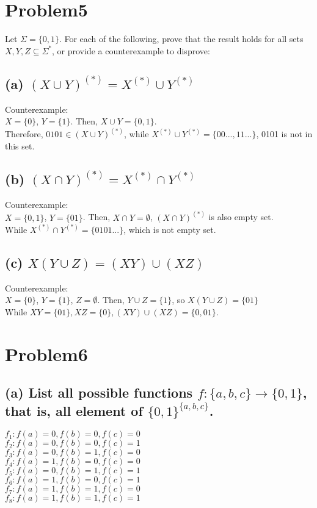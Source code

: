 \documentclass[]{article}
\begin{document}
\begin{spacing}{1.5}
\section*{Problem5}
Let $ \Sigma = \{0, 1\} $. For each of the following, prove that the result holds for all sets $ X,Y,Z \subseteq \Sigma^{*} $, or provide a counterexample to disprove:
\subsection*{(a) $ (X \cup Y)^{(*)} = X^{(*)} \cup Y^{(*)} $}
Counterexample:\\
$ X = \{ 0\} $, $ Y = \{ 1\} $. Then, $ X \cup Y = \{0,1\} $.\\
Therefore, $ 0101 \in (X \cup Y)^{(*)}$, while $ X^{(*)} \cup Y^{(*)} = \{00..., 11...\} $, 0101 is not in this set.

\subsection*{(b) $ (X \cap Y)^{(*)} = X^{(*)} \cap Y^{(*)} $}
Counterexample:\\
$ X = \{ 0, 1\} $, $ Y = \{ 01\} $. Then, $ X \cap Y = \emptyset $, $ (X \cap Y)^{(*)}  $ is also empty set.\\
While $ X^{(*)} \cap Y^{(*)} = \{0101...\} $, which is  not empty set.

\subsection*{(c) $ X(Y \cup Z) = (XY) \cup (XZ) $}
Counterexample:\\
$ X = \{ 0\} $, $ Y = \{ 1\} $, $ Z = \emptyset $. Then, $ Y \cup Z = \{ 1\}$, so $ X(Y \cup Z) = \{01\}$  \\
While $ XY = \{01\}, XZ = \{0\}, (XY) \cup (XZ) = \{0, 01\}$. 

\section*{Problem6}
\subsection*{(a) List all possible functions $ f : \{a, b, c\} \rightarrow \{0, 1\}$, that is, all element of $ \{0, 1\}^{\{a, b, c\}} $.}

$ f_1: f(a)=0, f(b)=0, f(c)=0 $\\
$ f_2: f(a)=0, f(b)=0, f(c)=1 $\\
$ f_3: f(a)=0, f(b)=1, f(c)=0 $\\
$ f_4: f(a)=1, f(b)=0, f(c)=0 $\\
$ f_5: f(a)=0, f(b)=1, f(c)=1 $\\
$ f_6: f(a)=1, f(b)=0, f(c)=1 $\\
$ f_7: f(a)=1, f(b)=1, f(c)=0 $\\
$ f_8: f(a)=1, f(b)=1, f(c)=1 $


\end{spacing}
\end{document}
